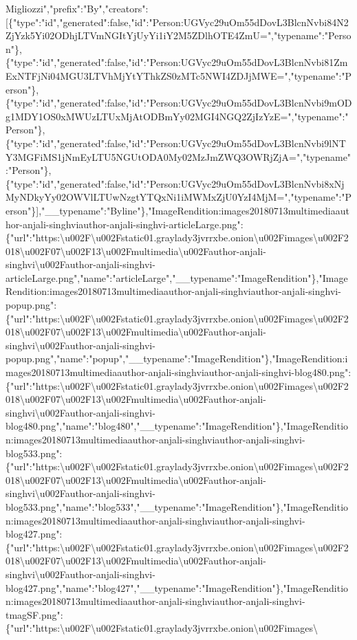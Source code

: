 Migliozzi","prefix":"By","creators":{[}\{"type":"id","generated":false,"id":"Person:UGVyc29uOm55dDovL3BlcnNvbi84N2ZjYzk5Yi02ODhjLTVmNGItYjUyYi1iY2M5ZDlhOTE4ZmU=","typename":"Person"\},\{"type":"id","generated":false,"id":"Person:UGVyc29uOm55dDovL3BlcnNvbi81ZmExNTFjNi04MGU3LTVhMjYtYThkZS0zMTc5NWI4ZDJjMWE=","typename":"Person"\},\{"type":"id","generated":false,"id":"Person:UGVyc29uOm55dDovL3BlcnNvbi9mODg1MDY1OS0xMWUzLTUxMjAtODBmYy02MGI4NGQ2ZjIzYzE=","typename":"Person"\},\{"type":"id","generated":false,"id":"Person:UGVyc29uOm55dDovL3BlcnNvbi9lNTY3MGFiMS1jNmEyLTU5NGUtODA0My02MzJmZWQ3OWRjZjA=","typename":"Person"\},\{"type":"id","generated":false,"id":"Person:UGVyc29uOm55dDovL3BlcnNvbi8xNjMyNDkyYy02OWVlLTUwNzgtYTQxNi1iMWMxZjU0YzI4MjM=","typename":"Person"\}{]},"\_\_typename":"Byline"\},"ImageRendition:images20180713multimediaauthor-anjali-singhviauthor-anjali-singhvi-articleLarge.png":\{"url":"https:\textbackslash{}u002F\textbackslash{}u002Fstatic01.graylady3jvrrxbe.onion\textbackslash{}u002Fimages\textbackslash{}u002F2018\textbackslash{}u002F07\textbackslash{}u002F13\textbackslash{}u002Fmultimedia\textbackslash{}u002Fauthor-anjali-singhvi\textbackslash{}u002Fauthor-anjali-singhvi-articleLarge.png","name":"articleLarge","\_\_typename":"ImageRendition"\},"ImageRendition:images20180713multimediaauthor-anjali-singhviauthor-anjali-singhvi-popup.png":\{"url":"https:\textbackslash{}u002F\textbackslash{}u002Fstatic01.graylady3jvrrxbe.onion\textbackslash{}u002Fimages\textbackslash{}u002F2018\textbackslash{}u002F07\textbackslash{}u002F13\textbackslash{}u002Fmultimedia\textbackslash{}u002Fauthor-anjali-singhvi\textbackslash{}u002Fauthor-anjali-singhvi-popup.png","name":"popup","\_\_typename":"ImageRendition"\},"ImageRendition:images20180713multimediaauthor-anjali-singhviauthor-anjali-singhvi-blog480.png":\{"url":"https:\textbackslash{}u002F\textbackslash{}u002Fstatic01.graylady3jvrrxbe.onion\textbackslash{}u002Fimages\textbackslash{}u002F2018\textbackslash{}u002F07\textbackslash{}u002F13\textbackslash{}u002Fmultimedia\textbackslash{}u002Fauthor-anjali-singhvi\textbackslash{}u002Fauthor-anjali-singhvi-blog480.png","name":"blog480","\_\_typename":"ImageRendition"\},"ImageRendition:images20180713multimediaauthor-anjali-singhviauthor-anjali-singhvi-blog533.png":\{"url":"https:\textbackslash{}u002F\textbackslash{}u002Fstatic01.graylady3jvrrxbe.onion\textbackslash{}u002Fimages\textbackslash{}u002F2018\textbackslash{}u002F07\textbackslash{}u002F13\textbackslash{}u002Fmultimedia\textbackslash{}u002Fauthor-anjali-singhvi\textbackslash{}u002Fauthor-anjali-singhvi-blog533.png","name":"blog533","\_\_typename":"ImageRendition"\},"ImageRendition:images20180713multimediaauthor-anjali-singhviauthor-anjali-singhvi-blog427.png":\{"url":"https:\textbackslash{}u002F\textbackslash{}u002Fstatic01.graylady3jvrrxbe.onion\textbackslash{}u002Fimages\textbackslash{}u002F2018\textbackslash{}u002F07\textbackslash{}u002F13\textbackslash{}u002Fmultimedia\textbackslash{}u002Fauthor-anjali-singhvi\textbackslash{}u002Fauthor-anjali-singhvi-blog427.png","name":"blog427","\_\_typename":"ImageRendition"\},"ImageRendition:images20180713multimediaauthor-anjali-singhviauthor-anjali-singhvi-tmagSF.png":\{"url":"https:\textbackslash{}u002F\textbackslash{}u002Fstatic01.graylady3jvrrxbe.onion\textbackslash{}u002Fimages\textbackslash